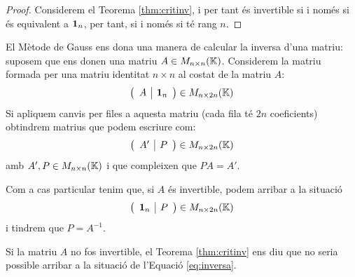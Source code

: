 \documentclass[
  11pt,
]{book}
\numberwithin{dummy}{section}
\theoremstyle{maincolornumbox}
\theoremstyle{blacknumex}
\theoremstyle{blacknumbox}
\theoremstyle{maincolornum}
\begin{document}
\begin{proof}
Considerem el Teorema
\ref{thm:critinv}, i per tant és invertible si i només si és
equivalent a \(\mathbf{1}_n\), per tant, si i només si té rang \(n\).
\end{proof}

El Mètode de Gauss ens dona una manera de calcular la inversa d'una
matriu: suposem que ens donen una matriu \(A \in M_{n\times n}(\mathbb{K})\).
Considerem la matriu formada per una matriu identitat \(n\times n\) al
costat de la matriu \(A\):
\[\left(\begin{array}{c|c}A & \mathbf{1}_n \end{array}\right) \in M_{n\times 2n}(\mathbb{K})\]
Si apliquem canvis per files a aquesta matriu (cada fila té \(2n\)
coeficients) obtindrem matrius que podem escriure com:
\[\left(\begin{array}{c|c}A'& P \end{array}\right) \in M_{n\times 2n}(\mathbb{K})\]
amb \(A',P\in M_{n\times n}(\mathbb{K})\) i que compleixen que \(PA=A'\).

Com a cas particular tenim que, si \(A\) és invertible, podem arribar a la
situació \begin{align*}
\label{eq:inversa}
\left(\begin{array}{c|c}\mathbf{1}_n & P \end{array}\right) \in M_{n\times 2n}(\mathbb{K})
\end{align*} i tindrem que \(P=A^{-1}\).

Si la matriu \(A\) no fos invertible, el
Teorema \ref{thm:critinv} ens diu que no seria possible arribar a la
situació de l'Equació
\eqref{eq:inversa}.
\end{document}
